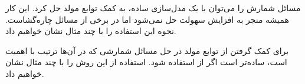 \p
مسائل شمارش را می‌توان با یک مدل‌سازی ساده، به کمک توابع مولد حل کرد.
این کار همیشه منجر به افزایش سهولت حل نمی‌شود اما در برخی از مسائل چاره‌گشاست.
نحوه این استفاده را با چند مثال نشان خواهیم داد.







\p
برای کمک گرفتن از توابع مولد در حل مسائل شمارشی که در آن‌ها ترتیب با اهمیت است،
ساده‌تر است اگر از  استفاده شود.
استفاده از این روش را با چند مثال نشان خواهیم داد.




